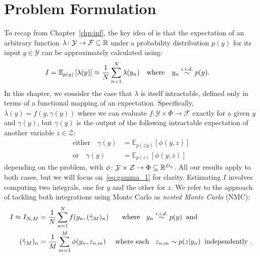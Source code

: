 
\section{Problem Formulation}
\label{sec:prob-form}

To recap from Chapter~\ref{chp:inf}, the key idea of \mc is that the expectation of an arbitrary function 
$\lambda \colon \mathcal{Y} \rightarrow \mathcal{F} \subseteq \mathbb{R}$ under a probability distribution $p(y)$ for its input $y \in \mathcal{Y}$ can be approximately calculated using:
\begin{align}
\label{eq:MC}
I &= \mathbb{E}_{p(y)} \left[\lambda(y)\right]
\approx \frac{1}{N} \sum_{n=1}^{N} \lambda(y_n) \quad \text{where} \quad y_n \overset{i.i.d.}{\sim} p(y).
\end{align}
In this chapter, we consider the case that $\lambda$ is itself intractable, defined only in terms of a functional mapping of an expectation. Specifically, $\lambda(y) = f(y,\gamma(y))$
where we can evaluate $f \colon \mathcal{Y} \times \Phi \rightarrow \mathcal{F}$ exactly for a given $y$ and $\gamma (y)$, but $\gamma(y)$ is the output of the following 
intractable expectation of another variable $z \in \mathcal{Z}$:
\begin{subequations}
	\label{eq:gamma}
	\begin{align}
	\label{eq:gamma_1}
	\text{either}\quad
	\gamma(y) &=  \mathbb{E}_{p(z | y)} \left[\phi(y,z)\right] \\
	\label{eq:gamma_2}
	\text{or} \quad \gamma(y) &= \mathbb{E}_{p(z)} \left[\phi(y,z)\right]
	\end{align}
\end{subequations}
depending on the problem, with $\phi \colon \mathcal{Y} \times \mathcal{Z} \rightarrow \Phi \subseteq \mathbb{R}^{D_{\phi}}$.
All our results apply to both cases, but we will focus on~\eqref{eq:gamma_1} for clarity.
Estimating $I$ involves computing two integrals, one for $y$ and the other for $z$. 
We refer to the approach of tackling both integrations using Monte Carlo 
as \emph{nested Monte Carlo} (NMC):
\begin{subequations}
\label{eq:nested-mc}
\begin{align}
I \approx I_{N,M} &= \frac{1}{N}  \sum_{n=1}^{N} f(y_n,(\hat{\gamma}_M)_n) \label{eq:nested-outer} \quad \;\;  \text{ where } \;\; y_n \overset{i.i.d.}{\sim} p(y) \;\;  \text{and} \\
(\hat{\gamma}_M)_n &= \frac{1}{M}  \sum_{m=1}^{M}  \phi(y_n,z_{n,m}) \label{eq:nested-inner} \quad
\text{ where each } \;\; z_{n,m} \sim p(z | y_n) \;\; \text{independently }.
\end{align}
\end{subequations}

